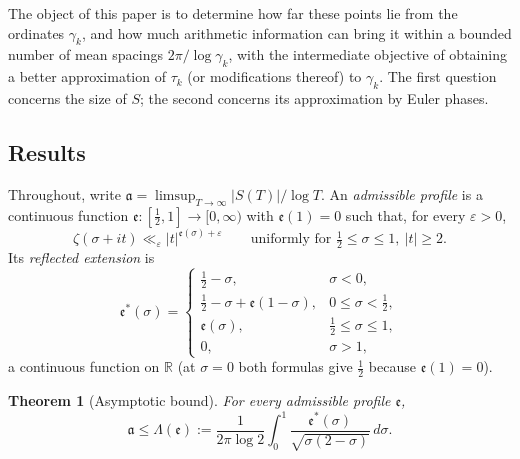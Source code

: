 \documentclass[11pt,a4paper]{article}
\numberwithin{equation}{section}
\newtheorem{theorem}{Theorem}[section]
\theoremstyle{definition}
\theoremstyle{remark}
\newcommand{\R}{\mathbb R}
\begin{document}
The object of this paper is to determine how far these points lie from the ordinates $\gamma_k$, and how much arithmetic information can bring it within a bounded number of mean spacings $2\pi/\log\gamma_k$, with the intermediate objective of obtaining a better approximation of $\tau_k$ (or modifications thereof) to $\gamma_k$. The first question concerns the size of $S$; the second concerns its approximation by Euler phases.

\subsection{Results}\label{subsec:results}
Throughout, write $\mathfrak a=\limsup_{T\to\infty}|S(T)|/\log T$. An \emph{admissible profile} is a continuous function $\mathfrak e:[\frac12,1]\to[0,\infty)$ with $\mathfrak e(1)=0$ such that, for every $\varepsilon>0$,
\begin{equation}
\zeta(\sigma+it)\ll_\varepsilon|t|^{\mathfrak e(\sigma)+\varepsilon}\qquad\text{uniformly for }\tfrac12\le\sigma\le1,\ |t|\ge2 .
\label{eq:admissible}
\end{equation}
Its \emph{reflected extension} is
\begin{equation}
\mathfrak e^*(\sigma)=\begin{cases}\frac12-\sigma,&\sigma<0,\\ \frac12-\sigma+\mathfrak e(1-\sigma),&0\le\sigma<\frac12,\\ \mathfrak e(\sigma),&\frac12\le\sigma\le1,\\ 0,&\sigma>1,\end{cases}
\label{eq:reflected}
\end{equation}
a continuous function on $\R$ (at $\sigma=0$ both formulas give $\frac12$ because $\mathfrak e(1)=0$).

\begin{theorem}[Asymptotic bound]\label{thm:envelope}
For every admissible profile $\mathfrak e$,
\begin{equation}
\mathfrak a\le\Lambda(\mathfrak e):=\frac1{2\pi\log2}\int_0^1\frac{\mathfrak e^*(\sigma)}{\sqrt{\sigma(2-\sigma)}}\,d\sigma .
\label{eq:envelope_formula}
\end{equation}
\end{theorem}
\end{document}
